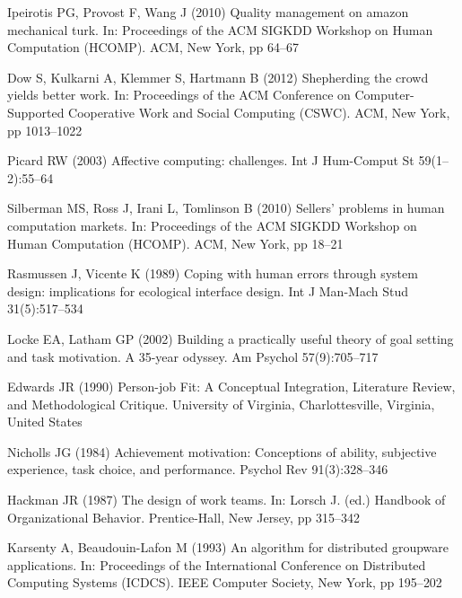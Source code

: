 \documentclass[11pt]{bmc_article_s50}
\begin{document}
\begin{thebibliography}{000}
Ipeirotis PG,
Provost F,
Wang J (2010)
{Quality management on amazon mechanical turk}.
In: {Proceedings of the ACM SIGKDD Workshop on Human Computation
  (HCOMP)}.
{ACM},
{New York},
pp 64--{67}


Dow S,
Kulkarni A,
Klemmer S,
Hartmann B (2012)
{Shepherding the crowd yields better work}.
In: {Proceedings of the ACM Conference on Computer-Supported
  Cooperative Work and Social Computing (CSWC)}.
{ACM},
{New York},
pp 1013--{1022}


Picard RW (2003)
{Affective computing: challenges}.
{Int J Hum-Comput St}
{59}(1--2):55--{64}


Silberman MS,
Ross J,
Irani L,
Tomlinson B (2010)
{Sellers' problems in human computation markets}.
In: {Proceedings of the ACM SIGKDD Workshop on Human Computation
  (HCOMP)}.
{ACM},
{New York},
pp 18--{21}

Rasmussen J,
Vicente K (1989)
{Coping with human errors through system design: implications for
  ecological interface design}.
{Int J Man-Mach Stud}
{31}(5):517--{534}



Locke EA,
Latham GP (2002)
{{Building a practically useful theory of goal setting and task
  motivation. A 35-year odyssey.}}
{Am Psychol}
{57}(9):705--{717}



Edwards JR (1990)
{Person-job Fit: A Conceptual Integration, Literature Review, and
  Methodological Critique}.
{University of Virginia},
{Charlottesville, Virginia, United States}



Nicholls JG (1984)
{Achievement motivation: Conceptions of ability, subjective experience,
  task choice, and performance}.
{Psychol Rev}
{91}(3):328--{346}



Hackman JR (1987)
{The design of work teams}.
In: Lorsch J. (ed.)
{Handbook of Organizational Behavior}.
{Prentice-Hall},
{New Jersey},
pp 315--{342}



Karsenty A,
Beaudouin-Lafon M (1993)
{An algorithm for distributed groupware applications}.
In: {Proceedings of the International Conference on Distributed
  Computing Systems (ICDCS)}.
{IEEE Computer Society},
{New York},
pp 195--{202}



\end{thebibliography}
\end{document}
